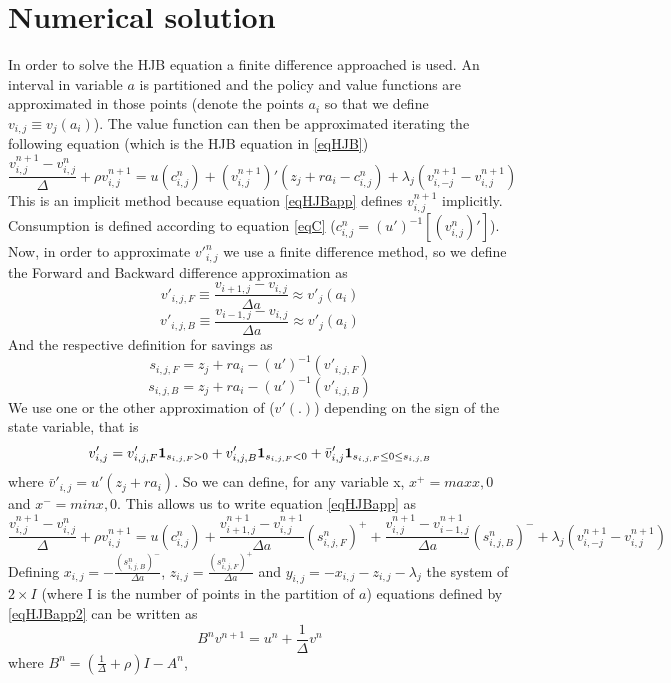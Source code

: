 \documentclass[12pt]{article}
\begin{document}
\section{Numerical solution}
In order to solve the HJB equation a finite difference approached is used. An interval in variable $a$ is partitioned and the policy and value functions are approximated in those points (denote the points $a_i$ so that we define $v_{i,j}\equiv v_j(a_i)$). The value function can then be approximated iterating the following equation (which is the HJB equation in \ref{eqHJB})
\begin{equation}\label{eqHJBapp}
\frac{v_{i,j}^{n+1}-v_{i,j}^{n}}{\Delta}+\rho v_{i,j}^{n+1}=u(c_{i,j}^{n})+(v_{i,j}^{n+1})'(z_j+ra_i-c_{i,j}^{n})+\lambda_j(v_{i,-j}^{n+1}-v_{i,j}^{n+1})
\end{equation}
This is an implicit method because equation \ref{eqHJBapp} defines $v_{i,j}^{n+1}$ implicitly. Consumption is defined according to equation \ref{eqC} ($c_{i,j}^n=(u')^{-1}[(v_{i,j}^n)']$). Now, in order to approximate ${v'}_{i,j}^n$ we use a finite difference method, so we define the Forward and Backward difference approximation as
\begin{equation}
v'_{i,j,F}\equiv \frac{v_{i+1,j}-v_{i,j}}{\Delta a}\approx v'_j(a_i)
\end{equation}
\begin{equation}
v'_{i,j,B}\equiv \frac{v_{i-1,j}-v_{i,j}}{\Delta a}\approx v'_j(a_i)
\end{equation}
And the respective definition for savings as
\begin{equation}
s_{i,j,F}=z_j+ra_i-(u')^{-1}(v'_{i,j,F})
\end{equation}
\begin{equation}
s_{i,j,B}=z_j+ra_i-(u')^{-1}(v'_{i,j,B})
\end{equation}
We use one or the other approximation of ($v'(.)$) depending on the sign of the state variable, that is
\begin{equation}
v'_{i,j}=v'_{i,j,F} \bold{1}_{s_{i,j,F}>0}+v'_{i,j,B} \bold{1}_{s_{i,j,F}<0}+\bar{v}'_{i,j} \bold{1}_{s_{i,j,F}\leq0\leq s_{i,j,B}}
\end{equation}
where $\bar{v}'_{i,j}=u'(z_j+ra_i)$. So we can define, for any variable x, $x^{+}=max{x,0}$ and $x^{-}=min{x,0}$. This allows us to write equation \ref{eqHJBapp} as
\begin{equation}\label{eqHJBapp2}
\frac{v_{i,j}^{n+1}-v_{i,j}^{n}}{\Delta}+\rho v_{i,j}^{n+1}=u(c_{i,j}^{n})+\frac{v_{i+1,j}^{n+1}-v_{i,j}^{n+1}}{\Delta a}(s_{i,j,F}^n)^{+}+\frac{v_{i,j}^{n+1}-v_{i-1,j}^{n+1}}{\Delta a}(s_{i,j,B}^n)^{-}+\lambda_j(v_{i,-j}^{n+1}-v_{i,j}^{n+1})
\end{equation}
Defining $x_{i,j}=-\frac{(s_{i,j,B}^n)^{-}}{\Delta a}$, $z_{i,j}=\frac{(s_{i,j,F}^n)^{+}}{\Delta a}$ and $y_{i,j}=-x_{i,j}-z_{i,j}-\lambda_j$ the system of $2\times I$ (where I is the number of points in the partition of $a$) equations defined by \ref{eqHJBapp2} can be written as
\begin{equation}
B^n v^{n+1}=u^n+\frac{1}{\Delta}v^n
\end{equation}
where $B^n=\left(\frac{1}{\Delta}+\rho\right)I-A^n$,
\end{document}

